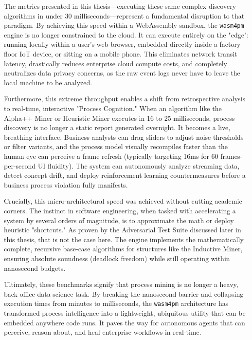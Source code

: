 \documentclass[12pt,a4paper]{report}
\begin{document}
The metrics presented in this thesis—executing these same complex discovery algorithms in under 30 milliseconds—represent a fundamental disruption to that paradigm. By achieving this speed within a WebAssembly sandbox, the \texttt{wasm4pm} engine is no longer constrained to the cloud. It can execute entirely on the "edge": running locally within a user's web browser, embedded directly inside a factory floor IoT device, or sitting on a mobile phone. This eliminates network transit latency, drastically reduces enterprise cloud compute costs, and completely neutralizes data privacy concerns, as the raw event logs never have to leave the local machine to be analyzed.

Furthermore, this extreme throughput enables a shift from retrospective analysis to real-time, interactive "Process Cognition." When an algorithm like the Alpha++ Miner or Heuristic Miner executes in 16 to 25 milliseconds, process discovery is no longer a static report generated overnight. It becomes a live, breathing interface. Business analysts can drag sliders to adjust noise thresholds or filter variants, and the process model visually recompiles faster than the human eye can perceive a frame refresh (typically targeting 16ms for 60 frames-per-second UI fluidity). The system can autonomously analyze streaming data, detect concept drift, and deploy reinforcement learning countermeasures before a business process violation fully manifests.

Crucially, this micro-architectural speed was achieved without cutting academic corners. The instinct in software engineering, when tasked with accelerating a system by several orders of magnitude, is to approximate the math or deploy heuristic "shortcuts." As proven by the Adversarial Test Suite discussed later in this thesis, that is not the case here. The engine implements the mathematically complete, recursive base-case algorithms for structures like the Inductive Miner, ensuring absolute soundness (deadlock freedom) while still operating within nanosecond budgets. 

Ultimately, these benchmarks signify that process mining is no longer a heavy, back-office data science task. By breaking the nanosecond barrier and collapsing execution times from minutes to milliseconds, the \texttt{wasm4pm} architecture has transformed process intelligence into a lightweight, ubiquitous utility that can be embedded anywhere code runs. It paves the way for autonomous agents that can perceive, reason about, and heal enterprise workflows in real-time.
\end{document}

